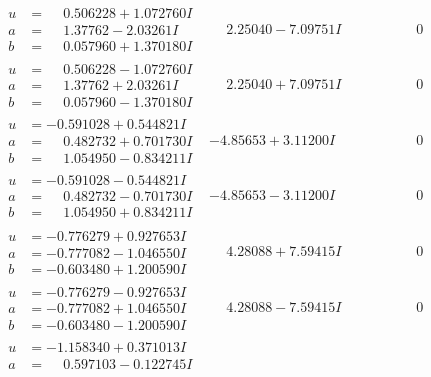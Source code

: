 \documentclass[1p]{elsarticle_modified}
\theoremstyle{definition}
\begin{document}
$$\begin{array}{c|c|c}
\begin{aligned}
u &= \phantom{-}0.506228 + 1.072760 I \\
a &= \phantom{-}1.37762 - 2.03261 I \\
b &= \phantom{-}0.057960 + 1.370180 I\end{aligned}
 & \phantom{-}2.25040 - 7.09751 I & \phantom{-0.000000 } 0 \\ \hline\begin{aligned}
u &= \phantom{-}0.506228 - 1.072760 I \\
a &= \phantom{-}1.37762 + 2.03261 I \\
b &= \phantom{-}0.057960 - 1.370180 I\end{aligned}
 & \phantom{-}2.25040 + 7.09751 I & \phantom{-0.000000 } 0 \\ \hline\begin{aligned}
u &= -0.591028 + 0.544821 I \\
a &= \phantom{-}0.482732 + 0.701730 I \\
b &= \phantom{-}1.054950 - 0.834211 I\end{aligned}
 & -4.85653 + 3.11200 I & \phantom{-0.000000 } 0 \\ \hline\begin{aligned}
u &= -0.591028 - 0.544821 I \\
a &= \phantom{-}0.482732 - 0.701730 I \\
b &= \phantom{-}1.054950 + 0.834211 I\end{aligned}
 & -4.85653 - 3.11200 I & \phantom{-0.000000 } 0 \\ \hline\begin{aligned}
u &= -0.776279 + 0.927653 I \\
a &= -0.777082 - 1.046550 I \\
b &= -0.603480 + 1.200590 I\end{aligned}
 & \phantom{-}4.28088 + 7.59415 I & \phantom{-0.000000 } 0 \\ \hline\begin{aligned}
u &= -0.776279 - 0.927653 I \\
a &= -0.777082 + 1.046550 I \\
b &= -0.603480 - 1.200590 I\end{aligned}
 & \phantom{-}4.28088 - 7.59415 I & \phantom{-0.000000 } 0 \\ \hline\begin{aligned}
u &= -1.158340 + 0.371013 I \\
a &= \phantom{-}0.597103 - 0.122745 I \\

\end{aligned}
\end{array}$$
\end{document}
